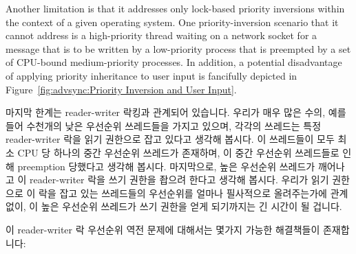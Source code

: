 Another limitation is that it addresses only lock-based priority
inversions within the context of a given operating system.
One priority-inversion scenario that it cannot address is a high-priority
thread waiting on a network socket for a message that is to be written
by a low-priority process that is preempted by a set of CPU-bound
medium-priority processes.
In addition, a potential disadvantage of applying priority inheritance
to user input is fancifully depicted in
Figure~\ref{fig:advsync:Priority Inversion and User Input}.
\fi

마지막 한계는 reader-writer 락킹과 관계되어 있습니다.
우리가 매우 많은 수의, 예를 들어 수천개의 낮은 우선순위 쓰레드들을 가지고
있으며, 각각의 쓰레드는 특정 reader-writer 락을 읽기 권한으로 잡고 있다고
생각해 봅시다.
이 쓰레드들이 모두 최소 CPU 당 하나의 중간 우선순위 쓰레드가 존재하며, 이 중간
우선순위 쓰레드들로 인해 preemption 당했다고 생각해 봅시다.
마지막으로, 높은 우선순위 쓰레드가 깨어나고 이 reader-writer 락을 쓰기 권한을
좝으려 한다고 생각해 봅시다.
우리가 읽기 권한으로 이 락을 잡고 있는 쓰레드들의 우선순위를 얼마나 필사적으로
올려주는가에 관계 없이, 이 높은 우선순위 쓰레드가 쓰기 권한을 얻게 되기까지는
긴 시간이 될 겁니다.

이 reader-writer 락 우선순위 역전 문제에 대해서는 몇가지 가능한 해결책들이
존재합니다:

